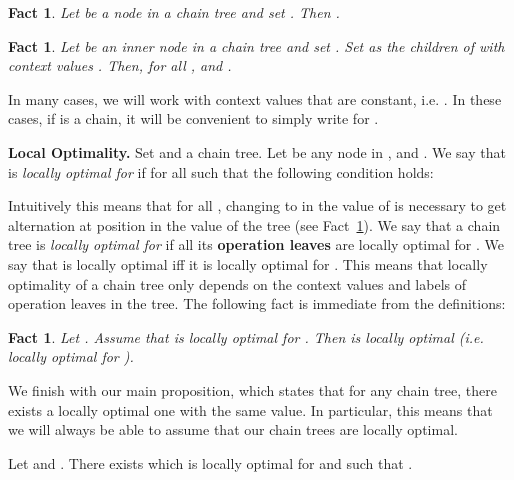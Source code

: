 \documentclass[envcountsame]{llncs}
\newcommand\chain{chain\xspace}
\newtheorem{fact}[theorem]{Fact}
\begin{document}
\begin{fact} \label{fct:value2}
  Let  be a node in a \chain tree  and set . Then .
\end{fact}
\begin{fact} \label{fct:value3}
  Let  be an inner node in a \chain tree  and set .  Set  as the children of  with
  context values . Then, for all
  ,  and
  .
\end{fact}

In many cases, we will work with context values that are constant,
i.e. . In these cases, if
 is a \chain, it will be convenient to simply write
 for .

\medskip
\noindent
{\bf Local Optimality.} Set  and  a \chain
tree. Let  be any node in , 
and . We say
that  is \emph{locally optimal for } if for all 
such that  the following condition holds:

Intuitively this means that for all , changing  to 
in the value of  is necessary to get alternation at position 
in the value of the tree (see Fact~\ref{fct:value2}). We say that a
\chain tree  is \emph{locally optimal for}  if all its
{\bf operation leaves} are locally optimal for . We say that
 is locally optimal iff it is locally optimal for .
This means that locally optimality of a \chain tree only depends on
the context values and labels of operation leaves in the tree. The
following fact is immediate from the definitions:

\begin{fact} \label{fct:optimal}
  Let . Assume that  is locally optimal for
  . Then  is locally optimal (i.e. locally optimal for
  ). 
\end{fact}

We finish with our main proposition, which states that for any \chain tree,
there exists a locally optimal one with the same value. In particular,
this means that we will always be able to assume that our \chain trees
are locally optimal.

\begin{proposition} \label{prop:optimal}
  Let  and . There exists  which is locally optimal for  and such that
  .
\end{proposition}
\end{document}
